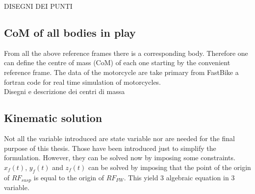 DISEGNI DEI PUNTI %

%
\subsection{CoM of all bodies in play}
%
From all the above reference frames there is a corresponding body. Therefore one can define the centre of mass (CoM) of each one starting by the convenient reference frame. The data of the motorcycle are take primary from FastBike a fortran code for real time simulation of motorcycles.\cite{cossalter2002motorcycle,cossalter2003multibody}\\
%

Disegni e descrizione dei centri di massa %

%

\subsection{Kinematic solution}
%
Not all the variable introduced are state variable nor are needed for the final purpose of this thesis. Those have been introduced just to simplify the formulation. However, they can be solved now by imposing some constraints.
$x_f(t)$, $y_f(t)$ and $z_f(t)$ can be solved by imposing that the point of the origin of $RF_{susp}$ is equal to the origin of $RF_{FW}$. This yield 3 algebraic equation in 3 variable.\\
%
\footnotesize

